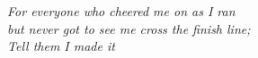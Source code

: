 \begin{dedication}
\textit{For everyone who cheered me on as I ran\\
but never got to see me cross the finish line;\\
Tell them I made it}
\end{dedication}